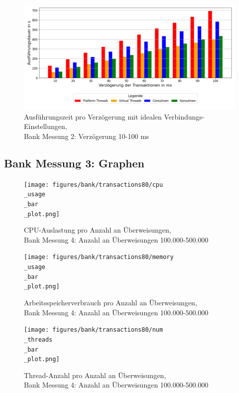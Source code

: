 \documentclass[fontsize=12pt,paper=a4,twoside=semi,parskip=half-,headsepline,headinclude]{scrreprt}
\begin{document}
\begin{figure}[H]
	\centering
	\includegraphics[scale=0.5]{figures/bank/delayIdeal/execution_time_plot.png}
	\caption{Ausführungszeit pro Verzögerung mit idealen Verbindungs-Einstellungen,\\ Bank Messung 2: Verzögerung 10-100 ms}
	\label{fig:bankdelayIdealZeit}
\end{figure}

\subsection{Bank Messung 3: Graphen}

\begin{figure}[H]
	\centering
	\texttt{[image: figures/bank/transactions80/cpu\\\_usage\\\_bar\\\_plot.png]}
	\caption{CPU-Auslastung pro Anzahl an Überweisungen,\\ Bank Messung 4: Anzahl an Überweisungen 100.000-500.000}
	\label{fig:bankTransactions80CPU}
\end{figure}

\begin{figure}[H]
	\centering
	\texttt{[image: figures/bank/transactions80/memory\\\_usage\\\_bar\\\_plot.png]}
	\caption{Arbeitsspeicherverbrauch pro Anzahl an Überweisungen,\\ Bank Messung 4: Anzahl an Überweisungen 100.000-500.000}
	\label{fig:bankTransactions80RAM}
\end{figure}

\begin{figure}[H]
	\centering
	\texttt{[image: figures/bank/transactions80/num\\\_threads\\\_bar\\\_plot.png]}
	\caption{Thread-Anzahl pro Anzahl an Überweisungen,\\ Bank Messung 4: Anzahl an Überweisungen 100.000-500.000}
	\label{fig:bankTransactions80Threads}
\end{figure}
\end{document}
